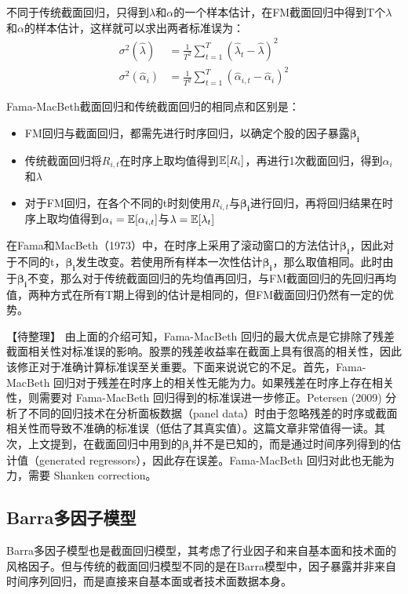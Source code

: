 \documentclass[11pt]{article}
\begin{document}
不同于传统截面回归，只得到$\lambda$和$\alpha$的一个样本估计，在FM截面回归中得到T个$\lambda$和$\alpha$的样本估计，这样就可以求出两者标准误为：
\begin{align*}
    \sigma^2(\hat{\lambda}) &= \frac{1}{T^2} \sum_{t=1}^{T} \left( \hat{\lambda}_t - \hat{\lambda} \right)^2 \\
    \sigma^2(\hat{\alpha}_i) &= \frac{1}{T^2} \sum_{t=1}^{T} \left( \hat{\alpha}_{i,t} - \hat{\alpha}_i \right)^2
\end{align*}

Fama-MacBeth截面回归和传统截面回归的相同点和区别是：
\begin{itemize}
    \item FM回归与截面回归，都需先进行时序回归，以确定个股的因子暴露$\bm{\beta_i}$
    \item 传统截面回归将$R_{i,t}$在时序上取均值得到$\mathbb{E}[R_i]$，再进行1次截面回归，得到$\alpha_i$和$\lambda$
    \item 对于FM回归，在各个不同的t时刻使用$R_{i,t}$与$\bm{\beta_{i}}$进行回归，再将回归结果在时序上取均值得到$\alpha_i = \mathbb{E}[\alpha_{i,t}]$与$\lambda=\mathbb{E}[\lambda_t]$
\end{itemize}

在Fama和MacBeth（1973）中，在时序上采用了滚动窗口的方法估计$\bm{\beta_i}$，因此对于不同的t，$\bm{\beta_i}$发生改变。若使用所有样本一次性估计$\bm{\beta_i}$，那么取值相同。此时由于$\bm{\beta_i}$不变，那么对于传统截面回归的先均值再回归，与FM截面回归的先回归再均值，两种方式在所有T期上得到的估计是相同的，但FM截面回归仍然有一定的优势。

【待整理】
由上面的介绍可知，Fama-MacBeth 回归的最大优点是它排除了残差截面相关性对标准误的影响。股票的残差收益率在截面上具有很高的相关性，因此该修正对于准确计算标准误至关重要。下面来说说它的不足。首先，Fama-MacBeth 回归对于残差在时序上的相关性无能为力。如果残差在时序上存在相关性，则需要对 Fama-MacBeth 回归得到的标准误进一步修正。Petersen (2009) 分析了不同的回归技术在分析面板数据（panel data）时由于忽略残差的时序或截面相关性而导致不准确的标准误（低估了其真实值）。这篇文章非常值得一读。其次，上文提到，在截面回归中用到的$\bm{\beta_i}$并不是已知的，而是通过时间序列得到的估计值（generated regressors），因此存在误差。Fama-MacBeth 回归对此也无能为力，需要 Shanken correction。

\subsection{Barra多因子模型}

Barra多因子模型也是截面回归模型，其考虑了行业因子和来自基本面和技术面的风格因子。但与传统的截面回归模型不同的是在Barra模型中，因子暴露并非来自时间序列回归，而是直接来自基本面或者技术面数据本身。
\end{document}
